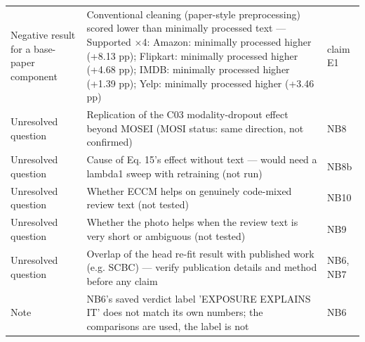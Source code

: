 {\begin{xltabular}{\linewidth}{>{\raggedright\arraybackslash}X>{\raggedright\arraybackslash}X>{\raggedright\arraybackslash}X}
Negative result for a base-paper component & Conventional cleaning (paper-style preprocessing) scored lower than minimally processed text — Supported $\times$4: Amazon: minimally processed higher (+8.13 pp); Flipkart: minimally processed higher (+4.68 pp); IMDB: minimally processed higher (+1.39 pp); Yelp: minimally processed higher (+3.46 pp) & claim E1 \\
Unresolved question & Replication of the C03 modality-dropout effect beyond MOSEI (MOSI status: same direction, not confirmed) & NB8 \\
Unresolved question & Cause of Eq. 15's effect without text — would need a lambda1 sweep with retraining (not run) & NB8b \\
Unresolved question & Whether ECCM helps on genuinely code-mixed review text (not tested) & NB10 \\
Unresolved question & Whether the photo helps when the review text is very short or ambiguous (not tested) & NB9 \\
Unresolved question & Overlap of the head re-fit result with published work (e.g. SCBC) — verify publication details and method before any claim & NB6, NB7 \\
Note & NB6's saved verdict label 'EXPOSURE EXPLAINS IT' does not match its own numbers; the comparisons are used, the label is not & NB6 \\
\end{xltabular}
}
